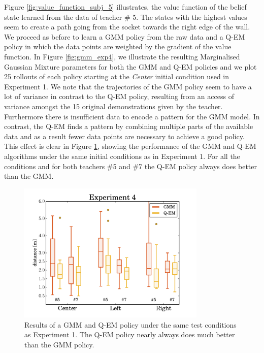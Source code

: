 Figure \ref{fig:value_function_subj_5} illustrates, the value function of the belief state learned from the data of teacher \# 5.
The states with the highest values seem to create a path going from the socket towards the right edge of the wall. 
We proceed as before to learn a GMM policy from the raw data and a Q-EM policy in which the data points are weighted by 
the gradient of the value function. In Figure \ref{fig:gmm_exp4}, we illustrate the 
resulting Marginalised Gaussian Mixture parameters for both the GMM and Q-EM policies and we plot 25 rollouts of each policy starting at 
the \textit{Center} initial condition used in Experiment 1. We note that the trajectories of the GMM 
policy seem to have a lot of variance in contrast to the Q-EM policy, resulting from an access of variance amongst the 15 original demonstrations
given by the teacher. Furthermore there is insufficient data to encode a pattern for the GMM model. In contrast, the Q-EM finds a 
pattern by combining multiple parts of the available data and as a result fewer data points are necessary to achieve a good policy. 
This effect is clear in Figure \ref{fig:experiment4_stats}, showing the performance of the GMM and Q-EM algorithms 
under the same initial conditions as in Experiment 1. For all the conditions and for both teachers \#5 and \#7 the Q-EM policy 
always does better than the GMM.

\begin{figure}
 \centering
 \includegraphics[width=0.8\textwidth]{./ch4-PiH/Figures/Fig/experiment4.pdf}
 \caption{Results of a GMM and Q-EM policy under the same test conditions as Experiment 1. The Q-EM policy nearly always does much better than the GMM policy.}
 \label{fig:experiment4_stats}
\end{figure}

